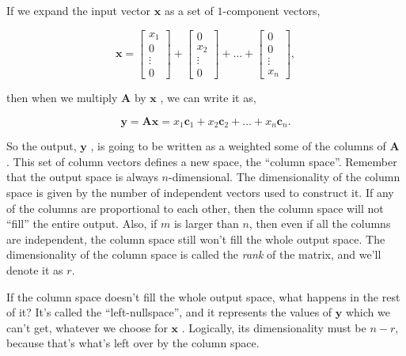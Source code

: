 \documentclass[a4paper,10pt]{article}
\newcommand{\mA}{$\mathbf{A}$ }
\newcommand{\vx}{$\mathbf{x}$ }
\newcommand{\vy}{$\mathbf{y}$ }
\begin{document}
If we expand the input vector \vx as a set of $1$-component vectors,

\begin{equation}
 \mathbf{x} = \begin{bmatrix} x_1 \\ 0 \\ \vdots \\ 0 \end{bmatrix} + \begin{bmatrix} 0 \\ x_2 \\ \vdots \\ 0 \end{bmatrix} + \dots + \begin{bmatrix} 0 \\ 0 \\ \vdots \\ x_n \end{bmatrix}   ,
\end{equation}

then when we multiply \mA by \vx, we can write it as,

\begin{equation}
 \mathbf{y} = \mathbf{A x} = x_1 \mathbf{c}_1 + x_2 \mathbf{c}_2 + \dots + x_n \mathbf{c}_n   .
\end{equation}

So the output, \vy, is going to be written as a weighted some of the columns of \mA. This set of column vectors defines a new space, the ``column space''. Remember that the output space is always $n$-dimensional. The dimensionality of the column space is given by the number of independent vectors used to construct it.  If any of the columns are proportional to each other, then the column space will not ``fill'' the entire output. Also, if $m$ is larger than $n$, then even if all the columns are independent, the column space still won't fill the whole output space. The dimensionality of the column space is called the \emph{rank} of the matrix, and we'll denote it as $r$. %

If the column space doesn't fill the whole output space, what happens in the rest of it? It's called the ``left-nullspace'', and it represents the values of \vy which we can't get, whatever we choose for \vx. Logically, its dimensionality must be $n - r$, because that's what's left over by the column space.
\end{document}

